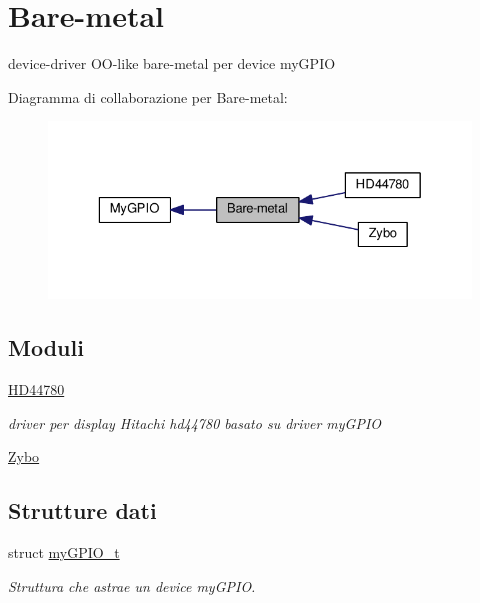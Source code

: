 \hypertarget{group__bare-metal}{\section{Bare-\/metal}
\label{group__bare-metal}
}


device-\/driver O\+O-\/like bare-\/metal per device my\+G\+P\+I\+O  


Diagramma di collaborazione per Bare-\/metal\+:\nopagebreak
\begin{figure}[H]
\begin{center}
\leavevmode
\includegraphics[width=329pt]{group__bare-metal}
\end{center}
\end{figure}
\subsection*{Moduli}
\begin{DoxyCompactItemize}
\item 
\hyperlink{group___h_d44780}{H\+D44780}
\begin{DoxyCompactList}\small\item\em driver per display Hitachi hd44780 basato su driver my\+G\+P\+I\+O \end{DoxyCompactList}\item 
\hyperlink{group___zybo}{Zybo}
\end{DoxyCompactItemize}
\subsection*{Strutture dati}
\begin{DoxyCompactItemize}
\item 
struct \hyperlink{structmy_g_p_i_o__t}{my\+G\+P\+I\+O\+\_\+t}
\begin{DoxyCompactList}\small\item\em Struttura che astrae un device my\+G\+P\+I\+O. \end{DoxyCompactList}\end{DoxyCompactItemize}
